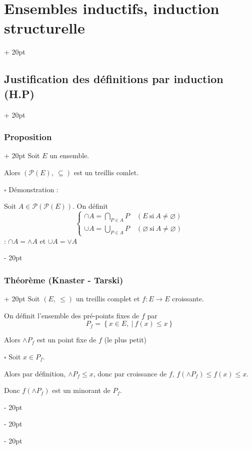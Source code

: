\documentclass[a4paper, 12pt, twoside]{article}
\newcommand{\eqsys}[2]{\begin{cases} #1 \\ #2 \end{cases}}
\newcommand{\set}[1]{\left\{ #1 \right\}}
\renewcommand{\le}{\leqslant}
\newcommand{\ind}[1][20pt]{\advance\leftskip + #1}
\newcommand{\deind}[1][20pt]{\advance\leftskip - #1}
\newenvironment{indt}[2][20pt]{#2 \par \ind[#1]}{\par \deind} %
\begin{document}
\begin{indt}{\section{Ensembles inductifs, induction structurelle}}
\begin{indt}{\subsection{Justification des définitions par induction (H.P)}}
            \begin{indt}{\subsubsection{Proposition}}
                Soit $E$ un ensemble.
                
                Alors $(\mathcal P(E),\ \subseteq)$ est un treillis comlet.
                
                \vspace{12pt}
                
                $\square$ Démonstration :
                
                Soit $A \in \mathcal P(\mathcal P(E))$. On définit
                    \[
                        \eqsys
                            {\displaystyle \cap A = \bigcap_{P \in A} P \quad (E\ \text{si}\ A \neq \varnothing)}
                            {\displaystyle \cup A = \bigcup_{P \in A} P \quad (\varnothing\ \text{si}\ A \neq \varnothing)}
                    \]
                 : $\cap A = \wedge A$ et $\cup A = \vee A$
            \end{indt}
            
            \vspace{12pt}
            
            \begin{indt}{\subsubsection{Théorème (Knaster - Tarski)}}
                Soit $(E, \ \le)$ un treillis complet et $f : E \longrightarrow E$ croissante.
                
                On définit l'ensemble des pré-points fixes de $f$ par
                    \[ P_f = \set{x \in E,\ |\ f(x) \le x} \]
                
                Alors $\wedge P_f$ est un point fixe de $f$ (le plus petit)
                
                \vspace{12pt}
                
                $\square$
                Soit $x \in P_f$.
                
                Alors par définition, $\wedge P_f \le x$, donc par croissance de $f$, $f(\wedge P_f) \le f(x) \le x$.
                
                Donc $f(\wedge P_f)$ est un minorant de $P_f$.
                

\end{indt}
\end{indt}
\end{indt}
\end{document}

